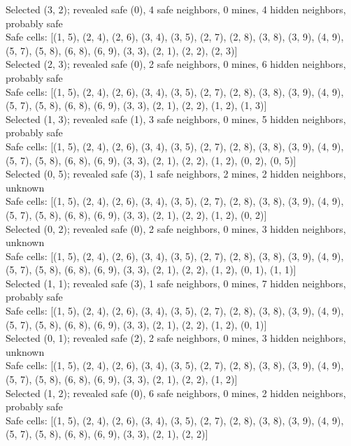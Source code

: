 \documentclass[11pt]{article} %
\begin{document}
Selected (3, 2); revealed safe (0), 4 safe neighbors, 0 mines, 4 hidden neighbors, probably safe\\
Safe cells: [(1, 5), (2, 4), (2, 6), (3, 4), (3, 5), (2, 7), (2, 8), (3, 8), (3, 9), (4, 9), (5, 7), (5, 8), (6, 8), (6, 9), (3, 3), (2, 1), (2, 2), (2, 3)]\\
Selected (2, 3); revealed safe (0), 2 safe neighbors, 0 mines, 6 hidden neighbors, probably safe\\
Safe cells: [(1, 5), (2, 4), (2, 6), (3, 4), (3, 5), (2, 7), (2, 8), (3, 8), (3, 9), (4, 9), (5, 7), (5, 8), (6, 8), (6, 9), (3, 3), (2, 1), (2, 2), (1, 2), (1, 3)]\\
Selected (1, 3); revealed safe (1), 3 safe neighbors, 0 mines, 5 hidden neighbors, probably safe\\
Safe cells: [(1, 5), (2, 4), (2, 6), (3, 4), (3, 5), (2, 7), (2, 8), (3, 8), (3, 9), (4, 9), (5, 7), (5, 8), (6, 8), (6, 9), (3, 3), (2, 1), (2, 2), (1, 2), (0, 2), (0, 5)]\\
Selected (0, 5); revealed safe (3), 1 safe neighbors, 2 mines, 2 hidden neighbors, unknown\\
Safe cells: [(1, 5), (2, 4), (2, 6), (3, 4), (3, 5), (2, 7), (2, 8), (3, 8), (3, 9), (4, 9), (5, 7), (5, 8), (6, 8), (6, 9), (3, 3), (2, 1), (2, 2), (1, 2), (0, 2)]\\
Selected (0, 2); revealed safe (0), 2 safe neighbors, 0 mines, 3 hidden neighbors, unknown\\
Safe cells: [(1, 5), (2, 4), (2, 6), (3, 4), (3, 5), (2, 7), (2, 8), (3, 8), (3, 9), (4, 9), (5, 7), (5, 8), (6, 8), (6, 9), (3, 3), (2, 1), (2, 2), (1, 2), (0, 1), (1, 1)]\\  
Selected (1, 1); revealed safe (3), 1 safe neighbors, 0 mines, 7 hidden neighbors, probably safe\\
Safe cells: [(1, 5), (2, 4), (2, 6), (3, 4), (3, 5), (2, 7), (2, 8), (3, 8), (3, 9), (4, 9), (5, 7), (5, 8), (6, 8), (6, 9), (3, 3), (2, 1), (2, 2), (1, 2), (0, 1)]\\
Selected (0, 1); revealed safe (2), 2 safe neighbors, 0 mines, 3 hidden neighbors, unknown\\
Safe cells: [(1, 5), (2, 4), (2, 6), (3, 4), (3, 5), (2, 7), (2, 8), (3, 8), (3, 9), (4, 9), (5, 7), (5, 8), (6, 8), (6, 9), (3, 3), (2, 1), (2, 2), (1, 2)]\\
Selected (1, 2); revealed safe (0), 6 safe neighbors, 0 mines, 2 hidden neighbors, probably safe\\
Safe cells: [(1, 5), (2, 4), (2, 6), (3, 4), (3, 5), (2, 7), (2, 8), (3, 8), (3, 9), (4, 9), (5, 7), (5, 8), (6, 8), (6, 9), (3, 3), (2, 1), (2, 2)]\\
\end{document}
